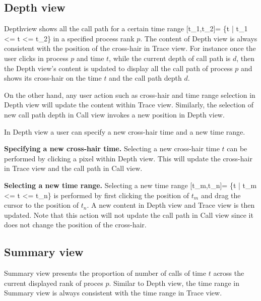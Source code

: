 \documentclass[english]{article}
\begin{document}
\subsection{Depth view}

Depthview shows all the call path for a certain time range [t_1,t_2]= \{t | t_1 <= t <= t_2\} in a specified process rank $p$. The content of Depth view is always consistent with the position of the cross-hair in Trace view.
For instance once the user clicks in process $p$ and time $t$, while the current depth of call path is $d$, then the Depth view's content is updated to display all the call path of process $p$ and shows its cross-hair on the time $t$ and the call path depth $d$.

On the other hand, any user action such as cross-hair and time range selection in Depth view will update the content within Trace view. Similarly, the selection of new call path depth in Call view invokes a new position in Depth view.

In Depth view a user can specify a new cross-hair time and a new time range.

\textbf{Specifying a new cross-hair time.} Selecting a new cross-hair time $t$ can be performed by clicking a pixel within Depth view. This will update the cross-hair in Trace view and the call path in Call view.

\textbf{Selecting a new time range.} Selecting a new time range [t_m,t_n]= \{t | t_m <= t <= t_n\} is performed by first clicking the position of $t_m$ and drag the cursor to the position of $t_n$. A new content in Depth view and Trace view is then updated. Note that this action will not update the call path in Call view since it does not change the position of the cross-hair.


\subsection{Summary view}

Summary view presents the proportion of number of calls of time $t$ across the current displayed rank of proces $p$. 
Similar to Depth view, the time range in Summary view is always consistent with the time range in Trace view.
\end{document}
